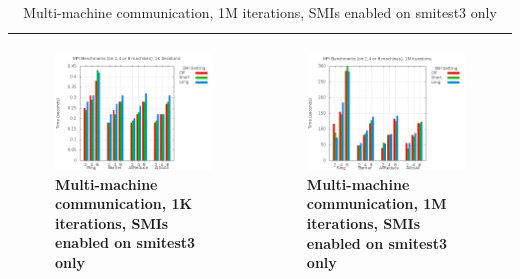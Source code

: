 \documentclass{IEEEtran}
\begin{document}

\begin{table}
  \caption{MPI Benchmark Tests}
  \label{ss_table1}
\begin{tabular}{|p{}|p{}|}
  \hline
  \begin{figure}[H]
  \includegraphics[keepaspectratio=true,width=240pt]{ss_graph1.png}
  \caption[cap1]{Multi-machine communication, 1K iterations, SMIs enabled on smitest3 only}
  \label{ss_graph1}
  \end{figure}
  & 
  \begin{figure}[H]
  \includegraphics[keepaspectratio=true,width=240pt]{ss_graph2.png}
  \caption[cap2]{Multi-machine communication, 1M iterations, SMIs enabled on smitest3 only}
  \label{ss_graph2}
  \end{figure}\\
  \hline



\end{tabular}
\end{table}
\end{document}
